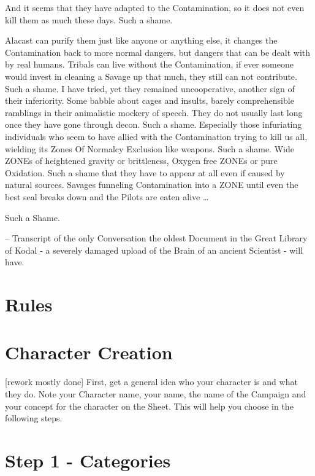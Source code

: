 \documentclass{book}
\begin{document}
    And it seems that they have adapted to the Contamination, so it does not even kill
    them as much these days.
    Such a shame. \par
    Alacast can purify them just like anyone or anything else,
    it changes the Contamination back to more normal dangers, but dangers that can be dealt with by real humans.
    Tribals can live without the Contamination,
    if ever someone would invest in cleaning a Savage up that much, they still can not contribute.
    Such a shame.
    I have tried, yet they remained uncooperative, another sign of their inferiority.
    Some babble about cages and insults, barely comprehensible ramblings in their animalistic mockery of
    speech.
    They do not usually last long once they have gone through decon.
    Such a shame.
    Especially those infuriating individuals who seem to have allied with the Contamination trying to kill us all,
    wielding its Zones Of Normalcy Exclusion like weapons.
    Such a shame.
    Wide ZONEs of heightened gravity or brittleness, Oxygen free ZONEs or pure Oxidation.
    Such a shame that they have to appear at all even if caused by natural sources.
    Savages funneling Contamination into a ZONE  until even the best seal breaks down and the Pilots are eaten alive
    \ldots \par Such a Shame. \par \vspace{1cm}
    -- Transcript of the only Conversation the oldest Document in the Great Library of Kodal - a severely damaged
    upload of the Brain of an ancient Scientist - will have.\newpage

    \section{Rules}\label{sec:rules}
    

    \section{Character Creation}
    [rework mostly done]\label{sec:characterCreation}
    First, get a general idea who your character is and what they do.
    Note your Character name, your name, the name of the
    Campaign and your concept for the character on the Sheet.
    This will help you choose in the following steps.

    \section{Step 1 - Categories}\label{subsec:step1-Categories}
\end{document}
